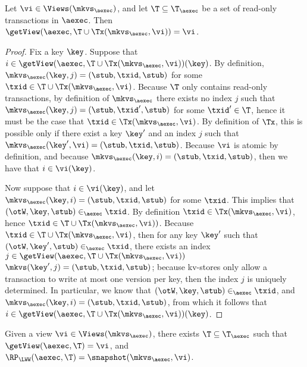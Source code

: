 \begin{proposition}
\label{prop:getview.tx}
Let $\vi \in \Views(\mkvs_{\aexec})$, and let $\T \subseteq \T_{\aexec}$ be a 
set of read-only transactions in $\aexec$. Then 
$\getView(\aexec, \T \cup \Tx(\mkvs_{\aexec}, \vi)) = \vi$. 
\end{proposition}

\begin{proof}
Fix a key $\key$. Suppose that $i \in \getView(\aexec, \T \cup \Tx(\mkvs_{\aexec}, \vi))(\key)$. 
By definition, $\mkvs_{\aexec}(\key, j) = (\stub, \txid, \stub)$ for some $\txid \in \T \cup \Tx(\mkvs_{\aexec}, \vi)$. 
Because $\T$ only contains read-only transactions, by definition of $\mkvs_{\aexec}$ there exists 
no index $j$ such that $\mkvs_{\aexec}(\key, j) = (\stub, \txid', \stub)$ for some $\txid' \in \T$, 
hence it must be the case that $\txid \in \Tx(\mkvs_{\aexec}, \vi)$. By definition of $\Tx$, 
this is possible only if there exist a key $\key'$ and an index $j$ such that $\mkvs_{\aexec}(\key', \vi) = (\stub, \txid, \stub)$. 
Because $\vi$ is atomic by definition, and because $\mkvs_{\aexec}(\key, i) = (\stub, \txid, \stub)$, then we have that $i \in \vi(\key)$. 

Now suppose that $i \in \vi(\key)$, and let $\mkvs_{\aexec}(\key, i) = (\stub, \txid, \stub)$ for some $\txid$. 
This implies that $(\otW, \key, \stub) \in_{\aexec} \txid$.
By definition $\txid \in \Tx(\mkvs_{\aexec}, \vi)$, hence $\txid \in \T \cup \Tx(\mkvs_{\aexec}, \vi))$. 
Because $\txid \in \T \cup \Tx(\mkvs_{\aexec}, \vi)$, then for any key $\key'$ such that 
$(\otW, \key', \stub) \in_{\aexec} \txid$, there exists an index $j \in \getView(\aexec, \T \cup \Tx(\mkvs_{\aexec}, \vi))$ 
$\mkvs(\key', j) = (\stub, \txid, \stub)$; because kv-stores only allow a transaction to write at most one version 
per key, then the index $j$ is uniquely determined. In particular, we know that $(\otW, \key, \stub) \in_{\aexec} \txid$, 
and $\mkvs_{\aexec}(\key, i) = (\stub, \txid, \stub)$, from which it follows that $i \in \getView(\aexec, \T \cup \Tx(\mkvs_{\aexec}, \vi))(\key)$.
\end{proof}


\begin{proposition}
\label{prop:compatible.kv2aexec}
Given a view $\vi \in \Views(\mkvs_{\aexec})$, there exists $\T \subseteq \T_{\aexec}$ 
such that $\getView(\aexec, \T) = \vi$, and $\RP_{\LWW}(\aexec, \T) = \snapshot(\mkvs_{\aexec}, \vi)$.
\end{proposition}

